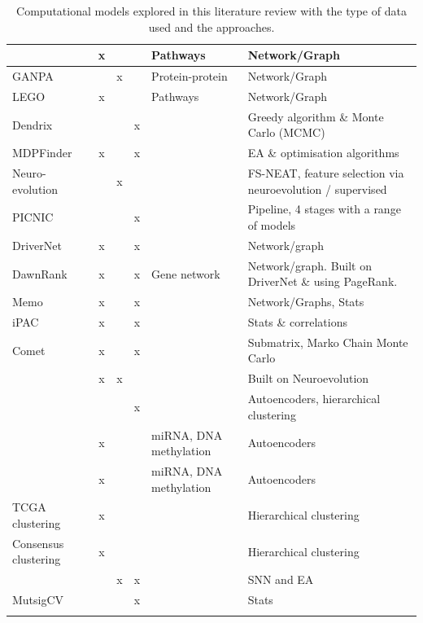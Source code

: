 \begin{appendices}
\begin{small}
\begin{longtable}[!h]{|p{2.0cm}|c|p{1.5cm}|c|p{2.2cm}|p{6.0cm}|}
          \endlastfoot    
            \citet{Cava2018-rv} & x &  &  & Pathways & Network/Graph \\ \hline
            GANPA &  & x &  & Protein-protein & Network/Graph \\ \hline
            LEGO & x &  &  &  Pathways  & Network/Graph \\ \hline
            Dendrix &  &  & x &  & Greedy algorithm \& Monte Carlo (MCMC) \\ \hline
            MDPFinder & x &  & x &  &  EA \& optimisation algorithms  \\ \hline
            Neuro-evolution &  & x &  &  & FS-NEAT, feature selection via neuroevolution / supervised \\ \hline
            PICNIC  &  &  & x &  & Pipeline, 4 stages with a range of models \\ \hline
            DriverNet & x &  & x &  & Network/graph \\ \hline
            DawnRank & x &  & x & Gene network &  Network/graph. Built on DriverNet \& using PageRank. \\ \hline
            Memo & x &  & x &  & Network/Graphs, Stats \\ \hline
            iPAC & x &  & x &  &  Stats \& correlations \\ \hline
            Comet  & x &  & x &  & Submatrix, Marko Chain Monte Carlo  \\ \hline
            \citet{Feltes2019-bd} & x & x &  &  & Built on Neuroevolution \\ \hline
            \citet{Palazzo2019-hx} &  &  & x &  & Autoencoders, hierarchical clustering \\ \hline
            \citet{Chaudhary2018-qj} & x &  &  & miRNA, DNA methylation & Autoencoders \\ \hline
            \citet{Ma2019-hk} & x &  &  & miRNA, DNA methylation & Autoencoders \\ \hline
            TCGA clustering & x &  &  &  & Hierarchical clustering \\ \hline
            Consensus clustering & x &  &  &  & Hierarchical clustering \\ \hline
           \citet{Capecci2020-uj} &  & x & x &  & SNN and EA \\ \hline
            MutsigCV &  &  & x &  & Stats \\ \hline
        \caption{Computational models explored in this literature review with the type of data used and the approaches.}
        \label{tab:data_used}
      \end{longtable}
    \end{small}
    

\end{appendices}
